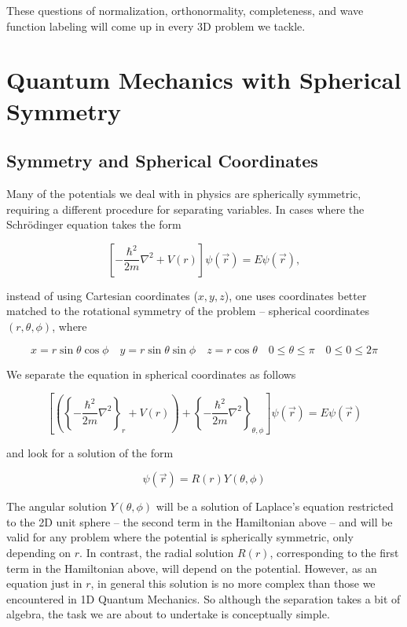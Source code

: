 These questions of normalization, orthonormality, completeness, and wave
function labeling will come up in every 3D problem we tackle. 

\section{Quantum Mechanics with Spherical Symmetry}

\subsection{Symmetry and Spherical Coordinates}

Many of the potentials we deal with in physics are spherically symmetric,
requiring a different procedure for separating variables. In cases where the
Schr\"odinger equation takes the form 

\[
  \left[ -\frac{\hbar^2}{2m} \nabla^2 + V(r) \right] \psi(\vec{r})
  = E\psi(\vec{r}),
\] \vspace{3px}

instead of using Cartesian coordinates ($x, y, z$), one uses coordinates better
matched to the rotational symmetry of the problem -- spherical coordinates $(r,
\theta, \phi)$, where 

\[
x = r\sin\theta\cos\phi \quad y = r\sin\theta\sin\phi \quad z = r\cos\theta
\quad 0 \leq \theta \leq \pi \quad 0 \leq 0 \leq 2\pi 
\] \vspace{3px}

We separate the equation in spherical coordinates as follows

\[
  \left[ \left( \left\{ -\frac{\hbar^2}{2m} \nabla^2\right\}_r + V(r) \right)
  + \left\{ -\frac{\hbar^2}{2m} \nabla^2 \right\}_{\theta, \phi} \right]
  \psi(\vec{r}) = E\psi(\vec{r})
\] \vspace{3px}

and look for a solution of the form 

\[
\psi(\vec{r}) = R(r) Y(\theta, \phi)
\] \vspace{3px}

The angular solution $Y(\theta, \phi)$ will be a solution of Laplace's equation
restricted to the 2D unit sphere -- the second term in the Hamiltonian above --
and will be valid for any problem where the potential is spherically symmetric,
only depending on $r$. In contrast, the radial solution $R(r)$, corresponding
to the first term in the Hamiltonian above, will depend on the potential.
However, as an equation just in $r$, in general this solution is no more
complex than those we encountered in 1D Quantum Mechanics. So although the
separation takes a bit of algebra, the task we are about to undertake is
conceptually simple. 


